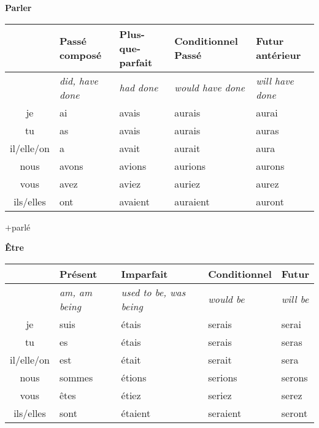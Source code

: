 \begin{flushleft}
\textbf{Parler}
\vskip 0.1cm
\begin{tabular}{|c||L{2.5cm}|L{2.5cm}|L{2.5cm}|L{2.5cm}|}
\hline
& Pass\'e compos\'e & Plus-que-parfait & Conditionnel Pass\'e & Futur ant\'erieur \\
\hline
& \textit{did, have done} & \textit{had done} & \textit{would have done} & \textit{will have done} \\
\hline\hline
je            &	ai	&	avais	&	aurais	 &	aurai	\\
tu            &	as 	&	avais	&	aurais	&	auras	\\
il/elle/on  &	a	&	avait	&	aurait	&	aura	\\
nous       &	avons	&	avions	&	aurions	&	aurons	\\
vous       &	avez	&	aviez	&	auriez		&	aurez	\\
ils/elles   &	ont 	&	avaient	&	auraient	&	auront	\\
\hline
\end{tabular}
\quad$+$\quad parl\'e
\end{flushleft}

\clearpage
\begin{flushleft}
\textbf{\^Etre}
\vskip 0.1cm
\begin{tabular}{|c||L{2.5cm}|L{2.5cm}|L{2.5cm}|L{2.5cm}|}
\hline
& Pr\'esent & Imparfait & Conditionnel & Futur \\
\hline
& \textit{am, am being} & \textit{used to be, was being} & \textit{would be} & \textit{will be} \\
\hline\hline
je            &	suis	&	\'etais	&	serais	 &	serai	\\
tu            &	es 	&	\'etais	&	serais	&	seras	\\
il/elle/on  &	est	&	\'etait	&	serait	&	sera	\\
nous       &	sommes	&	\'etions	&	serions	&	serons	\\
vous       &	\^etes	&	\'etiez	&	seriez		&	serez	\\
ils/elles   &	sont 	&	\'etaient	&	seraient	&	seront	\\
\hline
\end{tabular}
\end{flushleft}

